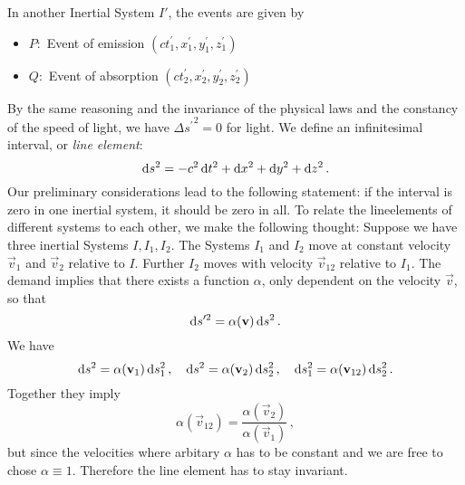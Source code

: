 In another Inertial System $I'$, the events are given by
\begin{itemize}
    \item $P:$ Event of emission $(ct_1^\prime,x_1^\prime,y_1^\prime,z_1^\prime)$
    \item $Q:$ Event of absorption
    $(ct_2^\prime,x_2^\prime,y_2^\prime,z_2^\prime)$
\end{itemize}
By the same reasoning and the invariance of the physical laws and the
constancy of the speed of light, we have ${\Delta s^\prime}^2=0$ for light.
We define an infinitesimal interval, or \emph{line element}:
\begin{equation}
    \dif s^2=-c^2\dif t^2+\dif x^2+\dif y^2+\dif z^2\, .
\end{equation}
Our preliminary considerations lead to the following statement: if the interval
is zero in one inertial system, it should be zero in all.
To relate the lineelements of different systems to each other, we make the
following thought:
Suppose we have three inertial Systems $I,I_1,I_2$.
The Systems $I_1$ and $I_2$ move at constant velocity $\vec{v}_1$ and $\vec{v}_2$ relative to $I$. Further
$I_2$ moves with velocity $\vec{v}_{12}$ relative to $I_1$. The demand implies
that there exists a function $\alpha$, only dependent on the velocity $\vec{v}$,
so that
\begin{equation}
    \dif s'^2=\alpha(\vec{v})\dif s^2\, .
\end{equation}
We have
\begin{equation}
    \dif s^2=\alpha(\vec{v}_1)\dif s_1^2\, ,\quad\dif s^2=\alpha(\vec{v}_2)\dif
    s_2^2\, ,\quad\dif s_1^2=\alpha(\vec{v}_{12})\dif s_2^2\, .
\end{equation}
Together they imply
\begin{equation}
    \alpha(\vec{v}_{12})=\frac{\alpha(\vec{v}_{2})}{\alpha(\vec{v}_{1})}\, ,
\end{equation}
but since the velocities where arbitary $\alpha$ has to be constant and we are
free to chose $\alpha\equiv 1$. Therefore the line element has to stay
invariant.

